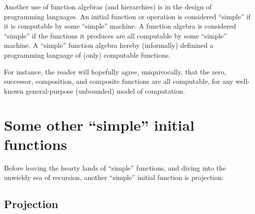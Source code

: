 Another use of function algebras (and hierarchies) is in the design of
programming languages.  An initial function or operation is considered
``simple'' if it is computable by some ``simple'' machine. A function algebra
is considered ``simple'' if the functions it produces are all computable by
some ``simple'' machine.  A ``simple'' function algebra hereby (informally)
definined a programming language of (only) computable functions.

For instance, the reader will hopefully agree, uniquivocally, that the zero,
successor, composition, and composite functions are all computable, for any
well-known general-purpose (unbounded) model of computation.







\section{Some other ``simple'' initial functions}

\label{sec:other-simple-initial-functions}

Before leaving the hearty lands of ``simple'' functions, and diving into the
unwieldy sea of recursion, another ``simple'' initial function is projection:

\subsection{Projection}

